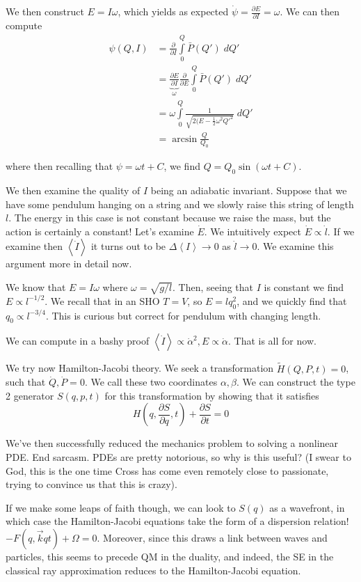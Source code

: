 \documentclass[10pt]{report}
\newcommand{\pd}[2]{\frac{\partial #1}{\partial#2}}
\newcommand{\expvalue}[1]{\left<#1\right>}
\begin{document}
We then construct $E = I\omega$, which yields as expected $\dot{\psi} = \pd{E}{I}= \omega$. We can then compute 
\begin{align*}
    \psi(Q,I) &= \pd{}{I}\displaystyle\int\limits_{0}^{Q}\bar{P}(Q')\;dQ'\\
    &= \underbrace{\pd{E}{I}}_{\omega}\pd{}{E}\displaystyle\int\limits_{0}^{Q}\bar{P}(Q')\;dQ'\\
    &= \omega \displaystyle\int\limits_{0}^{Q}\frac{1}{\sqrt{2(E-\frac{1}{2}\omega^2 Q'^2}}\;dQ'\\
    &= \arcsin \frac{Q}{Q_0}
\end{align*}

where then recalling that $\psi = \omega t + C$, we find $Q = Q_0\sin(\omega t + C)$. 

We then examine the quality of $I$ being an adiabatic invariant. Suppose that we have some pendulum hanging on a string and we slowly raise this string of length $l$. The energy in this case is not constant because we raise the mass, but the action is certainly a constant! Let's examine $\dot{E}$. We intuitively expect $\dot{E} \propto \dot{l}$. If we examine then $\expvalue{\dot{I}}$ it turns out to be $\Delta \expvalue{I} \to 0$ as $\dot{l} \to 0$. We examine this argument more in detail now.

We know that $E = I\omega$ where $\omega = \sqrt{g/l}$. Then, seeing that $I$ is constant we find $E \propto l^{-1/2}$. We recall that in an SHO $T=V$, so $E=lq_0^2$, and we quickly find that $q_0 \propto l^{-3/4}$. This is curious but correct for pendulum with changing length.

We can compute in a bashy proof $\expvalue{\dot{I}} \propto \dot{\alpha}^2, E \propto \dot{\alpha}$. That is all for now.

We try now Hamilton-Jacobi theory. We seek a transformation $\tilde{H}(Q,P,t) = 0$, such that $\dot{Q},\dot{P} = 0$. We call these two coordinates $\alpha,\beta$. We can construct the type 2 generator $S(q,p,t)$ for this transformation by showing that it satisfies 
$$H\left( q, \pd{S}{q},t \right) + \pd{S}{t} = 0$$

We've then successfully reduced the mechanics problem to solving a nonlinear PDE. End sarcasm. PDEs are pretty notorious, so why is this useful? (I swear to God, this is the one time Cross has come even remotely close to passionate, trying to convince us that this is crazy).

If we make some leaps of faith though, we can look to $S(q)$ as a wavefront, in which case the Hamilton-Jacobi equations take the form of a dispersion relation! $-F(q,\vec{k}qt) + \Omega = 0$. Moreover, since this draws a link between waves and particles, this seems to precede QM in the duality, and indeed, the SE in the classical ray approximation reduces to the Hamilton-Jacobi equation. 
\end{document}
